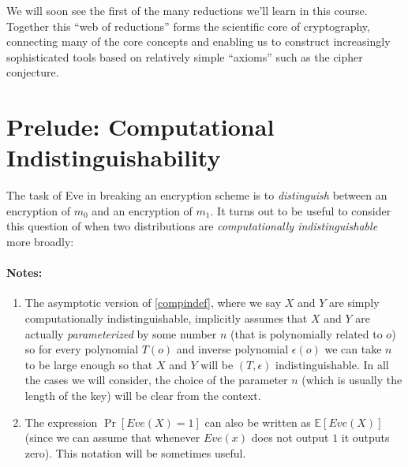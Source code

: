 We will soon see the first of the many reductions we'll learn in this
course. Together this ``web of reductions'' forms the scientific core of
cryptography, connecting many of the core concepts and enabling us to
construct increasingly sophisticated tools based on relatively simple
``axioms'' such as the cipher conjecture.

\section{Prelude: Computational
Indistinguishability}\label{2-Prelude-Computational-}

The task of Eve in breaking an encryption scheme is to
\emph{distinguish} between an encryption of \(m_0\) and an encryption of
\(m_1\). It turns out to be useful to consider this question of when two
distributions are \emph{computationally indistinguishable} more broadly:

\hypertarget{compindef}{}

\paragraph{Notes:}

\begin{enumerate}
\def\labelenumi{\arabic{enumi}.}
\item
  The asymptotic version of \cref{compindef}, where we say \(X\) and
  \(Y\) are simply computationally indistinguishable, implicitly assumes
  that \(X\) and \(Y\) are actually \emph{parameterized} by some number
  \(n\) (that is polynomially related to \(o\)) so for every polynomial
  \(T(o)\) and inverse polynomial \(\epsilon(o)\) we can take \(n\) to
  be large enough so that \(X\) and \(Y\) will be \((T,\epsilon)\)
  indistinguishable. In all the cases we will consider, the choice of
  the parameter \(n\) (which is usually the length of the key) will be
  clear from the context.
\item
  The expression \(\Pr[ Eve(X)=1]\) can also be written as
  \({\mathbb{E}}[Eve(X)]\) (since we can assume that whenever \(Eve(x)\)
  does not output \(1\) it outputs zero). This notation will be
  sometimes useful.
\end{enumerate}

